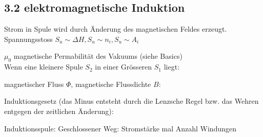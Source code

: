 \subsection*{3.2 elektromagnetische Induktion}
    Strom in Spule wird durch Änderung des magnetischen Feldes erzeugt.
    Spannungsstoss
    $ S_u \sim \Delta H, S_u \sim n_i, S_u \sim A_i$
    

    $\mu_0$ magnetische Permabilität des Vakuums (siehe Basics)\\
    Wenn eine kleinere Spule $S_2$ in einer Grösseren $S_1$ liegt: 

    magnetischer Fluss $\Phi$, magnetische Flussdichte $B$:
    
    Induktionsgesetz (das Minus entsteht durch die Lenzsche Regel bzw. das Wehren entgegen der zeitlichen Änderung):

    Induktionsspule: 
    Geschlossener Weg:  Stromstärke mal Anzahl Windungen